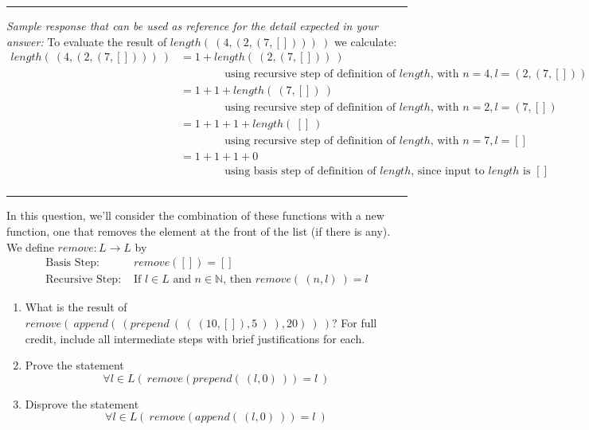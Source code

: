 \begin{enumerate}[labelindent=0pt, leftmargin=0pt]
    \rule{0.5\textwidth}{.4pt}
    
    {\it Sample response that can be used as reference for the detail expected 
    in your answer:} 
    To evaluate the result of $length(~(4,(2,(7,[])))~)$ we calculate: 
    \begin{align*}
        length(~(4,(2,(7,[])))~) &= 1 + length ( ~(2,(7,[]))~) \\
        & \qquad \qquad \text{using recursive step of definition of $length$, with $n=4, l=(2,(7,[]))$} \\
        &= 1 + 1 + length ( ~(7,[])~) \\
        & \qquad \qquad \text{using recursive step of definition of $length$, with $n=2, l=(7,[])$} \\
        &= 1 + 1 + 1+ length ( ~[]~) \\
        & \qquad \qquad \text{using recursive step of definition of $length$, with $n=7, l=[]$} \\
        &= 1 + 1 + 1 + 0\\
        & \qquad \qquad \text{using basis step of definition of $length$, since input to $length$ is $[]$} \\
    \end{align*}
    \rule{0.5\textwidth}{.4pt}
    

    In this question, we'll consider the combination of these functions with a new function, one 
    that removes the element at the front of the list (if there is any). We define $remove: L \to L$
    by
    \[
        \begin{array}{ll}
            \textrm{Basis Step: } & remove([]) = [] \\
            \textrm{Recursive Step: } & \textrm{If } l \in L\textrm{ and }n \in \mathbb{N} \textrm{, then } remove(~(n, l)~) = l
        \end{array}        
    \]
    \begin{enumerate}
        \item\gradeCorrect What is the result of $remove(~append(~(prepend~(~(~(10,[]), 5~)~), 20)~)~)$? 
        For full credit, include all intermediate steps with brief justifications for each.
        \item\gradeCorrect Prove the statement
        \[
            \forall l \in L \left(~ remove( prepend(~(l,0)~)) = l ~\right) 
        \]
        \item\gradeCorrect Disprove the statement
        \[
            \forall l \in L \left(~ remove( append(~(l,0)~)) = l ~\right) 
        \]
    \end{enumerate}


\end{enumerate}
